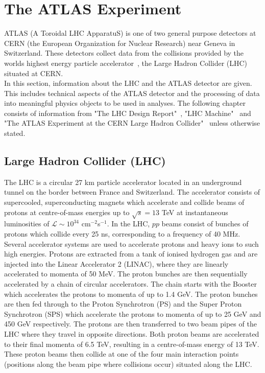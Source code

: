 \section{The ATLAS Experiment}
ATLAS (A Toroidal LHC ApparatuS) is one of two general purpose detectors at CERN (the European Organization for Nuclear Research) near Geneva in Switzerland. These detectors collect data from the collisions provided by the worlds highest energy particle accelerator~\cite{lhc-design-report}, the Large Hadron Collider (LHC) situated at CERN. \\

In this section, information about the LHC and the ATLAS detector are given. This includes technical aspects of the ATLAS detector and the processing of data into meaningful physics objects to be used in analyses. The following chapter consists of information from "The LHC Design Report"~\cite{lhc-design-report}, "LHC Machine"~\cite{Evans_2008} and "The ATLAS Experiment at the CERN Large Hadron Collider"~\cite{Collaboration_2008} unless otherwise stated.

\subsection{Large Hadron Collider (LHC)}
The LHC is a circular 27 km particle accelerator located in an underground tunnel on the border between France and Switzerland. The accelerator consists of supercooled, superconducting magnets which accelerate and collide beams of protons at centre-of-mass energies up to $\sqrt{s} = 13$ TeV at instantaneous luminosities of $\mathcal{L} \sim 10^{34}$ cm$^{-2}$s$^{-1}$. In the LHC, $pp$ beams consist of bunches of protons which collide every 25 ns, corresponding to a frequency of 40 MHz. Several accelerator systems are used to accelerate protons and heavy ions to such high energies. Protons are extracted from a tank of ionised hydrogen gas and are injected into the Linear Accelerator 2 (LINAC), where they are linearly accelerated to momenta of 50 MeV. The proton bunches are then sequentially accelerated by a chain of circular accelerators. The chain starts with the Booster which accelerates the protons to momenta of up to 1.4 GeV. The proton bunches are then fed through to the Proton Synchrotron (PS) and the Super Proton Synchrotron (SPS) which accelerate the protons to momenta of up to 25 GeV and 450 GeV respectively. The protons are then transferred to two beam pipes of the LHC where they travel in opposite directions. Both proton beams are accelerated to their final momenta of 6.5 TeV, resulting in a centre-of-mass energy of 13 TeV. These proton beams then collide at one of the four main interaction points (positions along the beam pipe where collisions occur) situated along the LHC. \\

